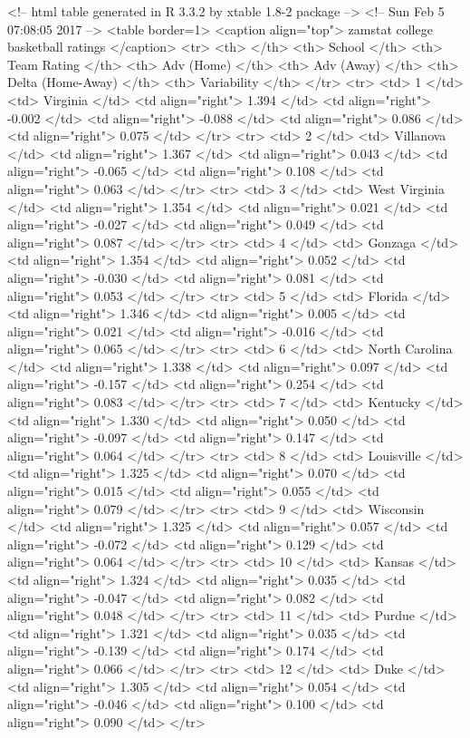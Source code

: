 <!-- html table generated in R 3.3.2 by xtable 1.8-2 package -->
<!-- Sun Feb  5 07:08:05 2017 -->
<table border=1>
<caption align="top"> zamstat college basketball ratings </caption>
<tr> <th>  </th> <th> School </th> <th> Team Rating </th> <th> Adv (Home) </th> <th> Adv (Away) </th> <th> Delta (Home-Away) </th> <th> Variability </th>  </tr>
  <tr> <td> 1 </td> <td> Virginia </td> <td align="right"> 1.394 </td> <td align="right"> -0.002 </td> <td align="right"> -0.088 </td> <td align="right"> 0.086 </td> <td align="right"> 0.075 </td> </tr>
  <tr> <td> 2 </td> <td> Villanova </td> <td align="right"> 1.367 </td> <td align="right"> 0.043 </td> <td align="right"> -0.065 </td> <td align="right"> 0.108 </td> <td align="right"> 0.063 </td> </tr>
  <tr> <td> 3 </td> <td> West Virginia </td> <td align="right"> 1.354 </td> <td align="right"> 0.021 </td> <td align="right"> -0.027 </td> <td align="right"> 0.049 </td> <td align="right"> 0.087 </td> </tr>
  <tr> <td> 4 </td> <td> Gonzaga </td> <td align="right"> 1.354 </td> <td align="right"> 0.052 </td> <td align="right"> -0.030 </td> <td align="right"> 0.081 </td> <td align="right"> 0.053 </td> </tr>
  <tr> <td> 5 </td> <td> Florida </td> <td align="right"> 1.346 </td> <td align="right"> 0.005 </td> <td align="right"> 0.021 </td> <td align="right"> -0.016 </td> <td align="right"> 0.065 </td> </tr>
  <tr> <td> 6 </td> <td> North Carolina </td> <td align="right"> 1.338 </td> <td align="right"> 0.097 </td> <td align="right"> -0.157 </td> <td align="right"> 0.254 </td> <td align="right"> 0.083 </td> </tr>
  <tr> <td> 7 </td> <td> Kentucky </td> <td align="right"> 1.330 </td> <td align="right"> 0.050 </td> <td align="right"> -0.097 </td> <td align="right"> 0.147 </td> <td align="right"> 0.064 </td> </tr>
  <tr> <td> 8 </td> <td> Louisville </td> <td align="right"> 1.325 </td> <td align="right"> 0.070 </td> <td align="right"> 0.015 </td> <td align="right"> 0.055 </td> <td align="right"> 0.079 </td> </tr>
  <tr> <td> 9 </td> <td> Wisconsin </td> <td align="right"> 1.325 </td> <td align="right"> 0.057 </td> <td align="right"> -0.072 </td> <td align="right"> 0.129 </td> <td align="right"> 0.064 </td> </tr>
  <tr> <td> 10 </td> <td> Kansas </td> <td align="right"> 1.324 </td> <td align="right"> 0.035 </td> <td align="right"> -0.047 </td> <td align="right"> 0.082 </td> <td align="right"> 0.048 </td> </tr>
  <tr> <td> 11 </td> <td> Purdue </td> <td align="right"> 1.321 </td> <td align="right"> 0.035 </td> <td align="right"> -0.139 </td> <td align="right"> 0.174 </td> <td align="right"> 0.066 </td> </tr>
  <tr> <td> 12 </td> <td> Duke </td> <td align="right"> 1.305 </td> <td align="right"> 0.054 </td> <td align="right"> -0.046 </td> <td align="right"> 0.100 </td> <td align="right"> 0.090 </td> </tr>
